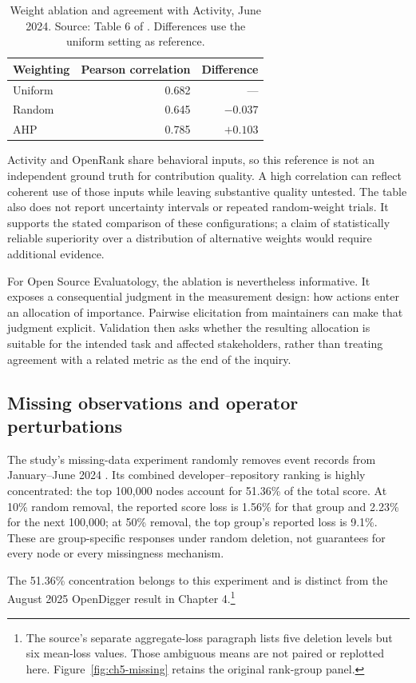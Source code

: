 \begin{table}[tbp]
\caption{Weight ablation and agreement with Activity, June 2024. Source: Table 6 of \citet{han2026rank}. Differences use the uniform setting as reference.}
\label{tab:ch5-weights}
\centering\small
\begin{tabular}{@{}lrr@{}}
\toprule
Weighting&Pearson correlation&Difference\\
\midrule
Uniform&0.682&---\\
Random&0.645&$-0.037$\\
AHP&0.785&$+0.103$\\
\bottomrule
\end{tabular}
\end{table}

Activity and OpenRank share behavioral inputs, so this reference is not an independent ground truth for contribution quality. A high correlation can reflect coherent use of those inputs while leaving substantive quality untested. The table also does not report uncertainty intervals or repeated random-weight trials. It supports the stated comparison of these configurations; a claim of statistically reliable superiority over a distribution of alternative weights would require additional evidence.

For Open Source Evaluatology, the ablation is nevertheless informative. It exposes a consequential judgment in the measurement design: how actions enter an allocation of importance. Pairwise elicitation from maintainers can make that judgment explicit. Validation then asks whether the resulting allocation is suitable for the intended task and affected stakeholders, rather than treating agreement with a related metric as the end of the inquiry.

\subsection{Missing observations and operator perturbations}
The study's missing-data experiment randomly removes event records from January--June 2024 \citep[Section 4.6]{han2026rank}. Its combined developer--repository ranking is highly concentrated: the top 100,000 nodes account for 51.36\% of the total score. At 10\% random removal, the reported score loss is 1.56\% for that group and 2.23\% for the next 100,000; at 50\% removal, the top group's reported loss is 9.1\%. These are group-specific responses under random deletion, not guarantees for every node or every missingness mechanism.

The 51.36\% concentration belongs to this experiment and is distinct from the August 2025 OpenDigger result in Chapter 4.\footnote{The source's separate aggregate-loss paragraph lists five deletion levels but six mean-loss values. Those ambiguous means are not paired or replotted here. Figure~\ref{fig:ch5-missing} retains the original rank-group panel.}

